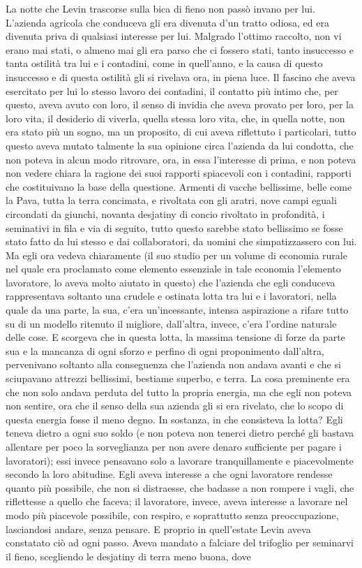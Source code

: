 La notte che Levin trascorse sulla bica di fieno non passò invano per lui. L'azienda agricola che conduceva gli era divenuta d'un tratto odiosa, ed era divenuta priva di qualsiasi interesse per lui. Malgrado l'ottimo raccolto, non vi erano mai stati, o almeno mai gli era parso che ci fossero stati, tanto insuccesso e tanta ostilità tra lui e i contadini, come in quell'anno, e la causa di questo insuccesso e di questa ostilità gli si rivelava ora, in piena luce. Il fascino che aveva esercitato per lui lo stesso lavoro dei contadini, il contatto più intimo che, per questo, aveva avuto con loro, il senso di invidia che aveva provato per loro, per la loro vita, il desiderio di viverla, quella stessa loro vita, che, in quella notte, non era stato più un sogno, ma un proposito, di cui aveva riflettuto i particolari, tutto questo aveva mutato talmente la sua opinione circa l'azienda da lui condotta, che non poteva in alcun modo ritrovare, ora, in essa l'interesse di prima, e non poteva non vedere chiara la ragione dei suoi rapporti spiacevoli con i contadini, rapporti che costituivano la base della questione. Armenti di vacche bellissime, belle come la Pava, tutta la terra concimata, e rivoltata con gli aratri, nove campi eguali circondati da giunchi, novanta desjatiny di concio rivoltato in profondità, i seminativi in fila e via di seguito, tutto questo sarebbe stato bellissimo se fosse stato fatto da lui stesso e dai collaboratori, da uomini che simpatizzassero con lui. Ma egli ora vedeva chiaramente (il suo studio per un volume di economia rurale nel quale era proclamato come elemento essenziale in tale economia l'elemento lavoratore, lo aveva molto aiutato in questo) che l'azienda che egli conduceva rappresentava soltanto una crudele e ostinata lotta tra lui e i lavoratori, nella quale da una parte, la sua, c'era un'incessante, intensa aspirazione a rifare tutto su di un modello ritenuto il migliore, dall'altra, invece, c'era l'ordine naturale delle cose. E scorgeva che in questa lotta, la massima tensione di forze da parte sua e la mancanza di ogni sforzo e perfino di ogni proponimento dall'altra, pervenivano soltanto alla conseguenza che l'azienda non andava avanti e che si sciupavano attrezzi bellissimi, bestiame superbo, e terra. La cosa preminente era che non solo andava perduta del tutto la propria energia, ma che egli non poteva non sentire, ora che il senso della sua azienda gli si era rivelato, che lo scopo di questa energia fosse il meno degno. In sostanza, in che consisteva la lotta? Egli teneva dietro a ogni suo soldo (e non poteva non tenerci dietro perché gli bastava allentare per poco la sorveglianza per non avere denaro sufficiente per pagare i lavoratori); essi invece pensavano solo a lavorare tranquillamente e piacevolmente secondo la loro abitudine. Egli aveva interesse a che ogni lavoratore rendesse quanto più possibile, che non si distraesse, che badasse a non rompere i vagli, che riflettesse a quello che faceva; il lavoratore, invece, aveva interesse a lavorare nel modo più piacevole possibile, con respiro, e soprattutto senza preoccupazione, lasciandosi andare, senza pensare. E proprio in quell'estate Levin aveva constatato ciò ad ogni passo. Aveva mandato a falciare del trifoglio per seminarvi il fieno, scegliendo le desjatiny di terra meno buona, dove 